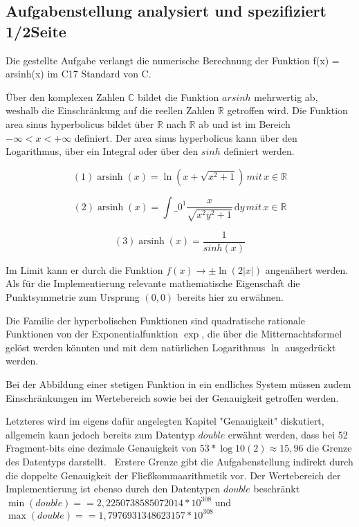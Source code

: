 \documentclass[course=erap]{aspdoc}
\begin{document}
    \subsection{Aufgabenstellung analysiert und spezifiziert 1/2Seite}
    Die gestellte Aufgabe verlangt die numerische Berechnung der Funktion f(x) = arsinh(x) im C17 Standard von C.


    Über den komplexen Zahlen $\mathbb{C}$ bildet die Funktion $arsinh$ mehrwertig ab, weshalb die Einschränkung auf die reellen Zahlen $\mathbb{R}$ getroffen wird.
    Die Funktion area sinus hyperbolicus bildet über $\mathbb{R}$ nach $\mathbb{R}$ ab und ist im Bereich $-\infty < x < + \infty$ definiert.
    Der area sinus hyperbolicus kann über den Logarithmus, über ein Integral oder über den $sinh$ definiert werden.

    $$ (1) \operatorname{arsinh}(x) = \ln \left(x + \sqrt{x^2 + 1} \right) \, mit \, x \in \mathbb{R}$$

    $$ (2) \operatorname{arsinh}(x) = \int\_{0}^{1} \frac{x}{\sqrt{x^2 y^2 + 1}} \,\mathrm{d}y \, mit \, x \in \mathbb{R} $$

    $$ (3) \operatorname{arsinh}(x) = \frac{1}{sinh(x)} $$

    Im Limit kann er durch die Funktion $f(x)\to \pm \ln(2|x|)$ angenähert werden.
    Als für die Implementierung relevante mathematische Eigenschaft die Punktsymmetrie zum Ursprung $(0,0)$ bereits hier zu erwähnen.


    Die Familie der hyperbolischen Funktionen sind quadratische rationale Funktionen von der Exponentialfunktion $\exp$,
    die über die Mitternachtsformel gelöst werden könnten und mit dem natürlichen Logarithmus $\ln$ ausgedrückt werden.


    Bei der Abbildung einer stetigen Funktion in ein endliches System müssen zudem Einschränkungen im Wertebereich sowie bei der Genauigkeit getroffen werden.


    Letzteres wird im eigens dafür angelegten Kapitel "Genauigkeit" diskutiert, allgemein kann jedoch bereits zum Datentyp $double$ erwähnt werden, dass bei 52 Fragment-bits eine dezimale Genauigkeit von $53*\log10(2) \approx 15,96$ die Grenze des Datentyps darstellt.~\cite{StandardforBinaryFloating-PointArithmetic}
    Erstere Grenze gibt die Aufgabenstellung indirekt durch die doppelte Genauigkeit der Fließkommaarithmetik vor.
    Der Wertebereich der Implementierung ist ebenso durch den Datentypen $double$ beschränkt $\min(double) =  = 2,2250738585072014* 10^308$ und $\max(double) =  = 1,7976931348623157 * 10^308$
\end{document}
